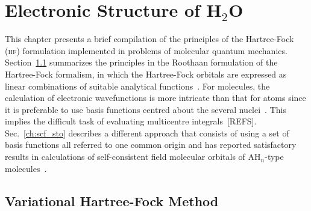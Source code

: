 
\chapter{Electronic Structure of H$_{2}$O}
\label{cha:scf_h2o}





This chapter presents a brief compilation of the principles of the
Hartree-Fock (\textsc{hf}) formulation implemented in problems of
molecular quantum mechanics. Section~\ref{ch:var_hf} summarizes the
principles in the Roothaan formulation of the Hartree-Fock formalism,
in which the Hartree-Fock orbitals are expressed as linear
combinations of suitable analytical functions~\cite{Roothaan_HF}. For
molecules, the calculation of electronic wavefunctions is more
intricate than that for atoms since it is preferable to use basis
functions centred about the several
nuclei~\cite{Pitzer_1968,Pitzer_1970}. This implies the difficult task
of evaluating multicentre integrals~[REFS]. Sec.~\ref{ch:scf_sto}
describes a different approach that consists of using a set of basis
functions all referred to one common origin and has reported
satisfactory results in calculations of self-consistent field
molecular orbitals of AH$_{n}$-type molecules~\cite{Moccia_JCP_2164,
  Moccia_1964}.


\section{Variational Hartree-Fock Method}
\label{ch:var_hf}






